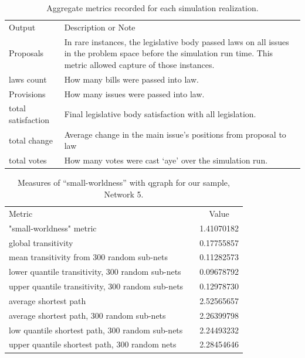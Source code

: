 \documentclass[pdftex,12pt]{llncs}
\begin{document}
\begin{table}
 \caption{Aggregate metrics recorded for each simulation realization.}
 \begin{tabular*}{1.0\textwidth}{lp{5in}}
 \hline\noalign{\smallskip}
 Output & Description or Note \\
 \noalign{\smallskip}
 \hline
 \noalign{\smallskip}
 Proposals & In rare instances, the legislative body passed laws on all issues in the problem space before the simulation run time.  This metric allowed capture of those instances. \\
 laws count & How many bills were passed into law. \\
 Provisions & How many issues were passed into law. \\
 total satisfaction & Final legislative body satisfaction with all legislation. \\
 total change & Average change in the main issue's positions from proposal to law \\
 total votes & How many votes were cast `aye' over the simulation run. \\
 \hline 
 \end{tabular*}
 \label{metrics}
\end{table}

\begin{table}
 \caption{Measures of ``small-worldness'' with qgraph for our sample, Network 5.}
 \begin{tabular*}{1.0\textwidth}{lcc}
 \hline\noalign{\smallskip}
 Metric & & Value \\
 \noalign{\smallskip}
 \hline
 \noalign{\smallskip}
 "small-worldness" metric & & 1.41070182 \\
 global transitivity & &  0.17755857 \\
 mean transitivity from 300 random sub-nets & & 0.11282573 \\
 lower quantile transitivity, 300 random sub-nets & & 0.09678792 \\
 upper quantile transitivity, 300 random sub-nets & & 0.12978730 \\
 average shortest path & & 2.52565657 \\
 average shortest path, 300 random sub-nets & & 2.26399798 \\
 low quantile shortest path, 300 random sub-nets & & 2.24493232 \\
 upper quantile shortest path, 300 random nets & & 2.28454646 \\
 \hline 
 \end{tabular*}
 \label{smallworlness}
\end{table}

\printbibliography
\end{document}
